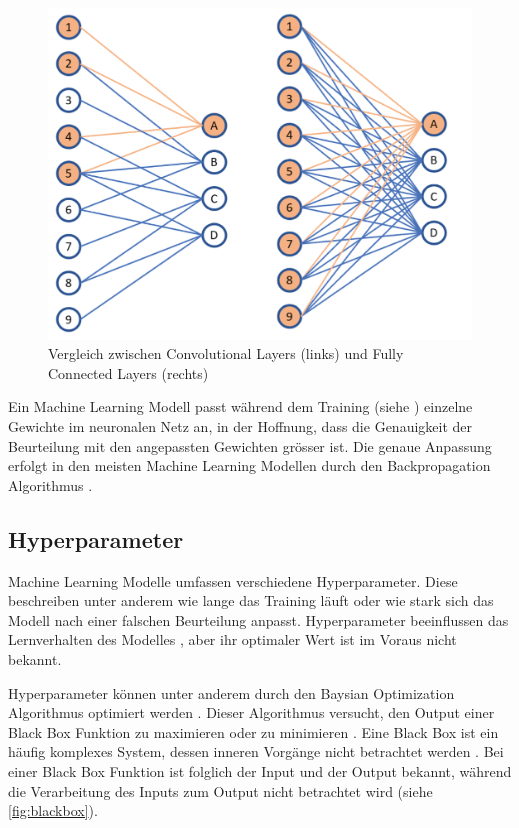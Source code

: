 \begin{figure}[!ht]
    \centering
    \includegraphics[width=\textwidth]{images/theorie/conv-v-dens.png}
    \caption{Vergleich zwischen Convolutional Layers (links) und Fully Connected Layers (rechts) \cite{unzueta_convolutional_2022}}
    \label{fig:conv-v-dens}
\end{figure}

Ein Machine Learning Modell passt während dem Training (siehe
) einzelne Gewichte im neuronalen Netz an, in der Hoffnung,
dass die Genauigkeit der Beurteilung mit den angepassten Gewichten grösser
ist. Die genaue Anpassung erfolgt in den meisten Machine Learning Modellen durch
den Backpropagation Algorithmus
\cite{ognjanovski_everything_2020}\cite{david_e_rumelhart_learning_nodate}.



\subsection{Hyperparameter}\label{sub:t_ml_hyper}
Machine Learning Modelle umfassen verschiedene Hyperparameter. Diese beschreiben
unter anderem wie lange das Training läuft oder wie stark sich das Modell nach
einer falschen Beurteilung anpasst. Hyperparameter beeinflussen das
Lernverhalten des Modelles \cite{nyuytiymbiy_parameters_2022}, aber ihr
optimaler Wert ist im Voraus nicht bekannt.

Hyperparameter können unter anderem durch den Baysian Optimization Algorithmus
optimiert werden \cite{agnihotri_exploring_2020}\cite{paretos_bayesian_2021}.
Dieser Algorithmus versucht, den Output einer Black Box Funktion zu maximieren
oder zu minimieren \cite[S. 15]{garnett_bayesian_nodate}. Eine Black Box ist ein
häufig komplexes System, dessen inneren Vorgänge nicht betrachtet werden
\cite{noauthor_black_2021}. Bei einer Black Box Funktion ist folglich der Input
und der Output bekannt, während die Verarbeitung des Inputs zum Output nicht
betrachtet wird (siehe \autoref{fig:blackbox}).

